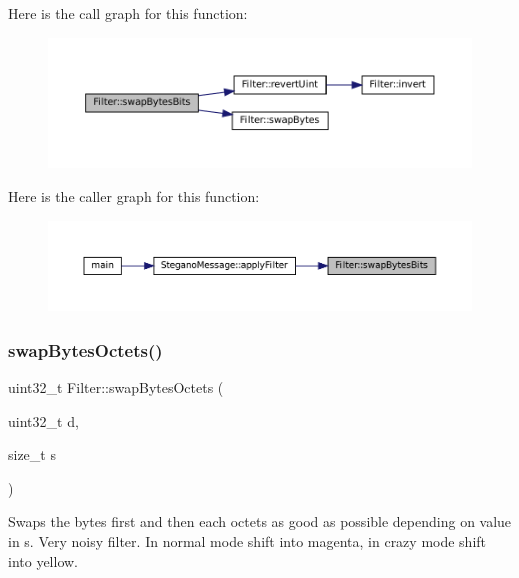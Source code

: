 Here is the call graph for this function\+:\nopagebreak
\begin{figure}[H]
\begin{center}
\leavevmode
\includegraphics[width=350pt]{classFilter_a42c3e8f730c64a1bcdf187dc0a09082d_cgraph}
\end{center}
\end{figure}
Here is the caller graph for this function\+:
\nopagebreak
\begin{figure}[H]
\begin{center}
\leavevmode
\includegraphics[width=350pt]{classFilter_a42c3e8f730c64a1bcdf187dc0a09082d_icgraph}
\end{center}
\end{figure}
\mbox{\label{classFilter_a55c046859fbbb468536cae5c1f95c702}} 
\subsubsection{\texorpdfstring{swapBytesOctets()}{swapBytesOctets()}}
{\footnotesize\ttfamily uint32\+\_\+t Filter\+::swap\+Bytes\+Octets (\begin{DoxyParamCaption}\item[{uint32\+\_\+t}]{d,  }\item[{size\+\_\+t}]{s }\end{DoxyParamCaption})\hspace{0.3cm}{\ttfamily [static]}}



Swaps the bytes first and then each octets as good as possible depending on value in s. Very noisy filter. In normal mode shift into magenta, in crazy mode shift into yellow. 


